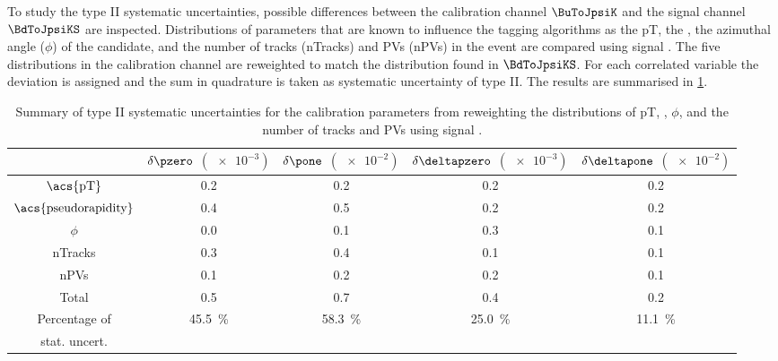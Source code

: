 To study the type II systematic uncertainties, possible differences between the
calibration channel $\BuToJpsiK$ and the signal channel $\BdToJpsiKS$ are
inspected. Distributions of parameters that are known to influence the tagging
algorithms as the \acf{pT}, the \pseudorapidity, the azimuthal angle ($\phi$) of
the \Bmeson candidate, and the number of tracks (nTracks) and \aclp{PV}
(n\acsp{PV}) in the event are compared using signal \sweights. The five
distributions in the calibration channel are reweighted to match the
distribution found in $\BdToJpsiKS$. For each correlated variable the deviation
is assigned and the sum in quadrature is taken as systematic uncertainty of type
II. The results are summarised in
\cref{tab:flavour_tagging:calibration:os:systematics}.
%
\begin{table}
  \centering
  \caption{Summary of type II systematic uncertainties for the \OS calibration
  parameters from reweighting the distributions of \ac{pT}, \pseudorapidity,
  $\phi$, and the number of tracks and \acp{PV} using signal \sweights.
  \cite{Aaij:2015vza}}
  \label{tab:flavour_tagging:calibration:os:systematics}
  \begin{tabular}{ccccc}
    \toprule
      & $\delta\pzero$ $(\num{e-3})$ & $\delta\pone$ $(\num{e-2})$ & $\delta\deltapzero$ $(\num{e-3})$ & $\delta\deltapone$ $(\num{e-2})$ \\
    \midrule
    $\text{\acs{pT}}$             & 0.2 & 0.2 & 0.2 & 0.2 \\
    $\text{\acs{pseudorapidity}}$ & 0.4 & 0.5 & 0.2 & 0.2 \\
    $\phi$                        & 0.0 & 0.1 & 0.3 & 0.1 \\
    nTracks                       & 0.3 & 0.4 & 0.1 & 0.1 \\
    nPVs                          & 0.1 & 0.2 & 0.2 & 0.1 \\
    \midrule
      Total                       & 0.5 & 0.7 & 0.4 & 0.2 \\
    \midrule
    Percentage of & 
    \multirow{2}[2]{*}{\SI{45.5}{\percent}} & 
    \multirow{2}[2]{*}{\SI{58.3}{\percent}} & 
    \multirow{2}[2]{*}{\SI{25.0}{\percent}} & 
    \multirow{2}[2]{*}{\SI{11.1}{\percent}} \\
    stat. uncert. \\
    \bottomrule
  \end{tabular}
\end{table}

